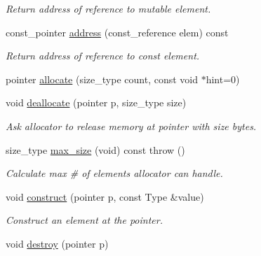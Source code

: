 \begin{DoxyCompactItemize}
\begin{DoxyCompactList}\small\item\em Return address of reference to mutable element. \end{DoxyCompactList}\item 
\hypertarget{classLoki_1_1LokiAllocator_a6f984e7db2d509ad2b49d2229974d87c}{}const\+\_\+pointer \hyperlink{classLoki_1_1LokiAllocator_a6f984e7db2d509ad2b49d2229974d87c}{address} (const\+\_\+reference elem) const \label{classLoki_1_1LokiAllocator_a6f984e7db2d509ad2b49d2229974d87c}

\begin{DoxyCompactList}\small\item\em Return address of reference to const element. \end{DoxyCompactList}\item 
pointer \hyperlink{classLoki_1_1LokiAllocator_a856c0d1e1f32b786421c02d468020758}{allocate} (size\+\_\+type count, const void $\ast$hint=0)
\item 
\hypertarget{classLoki_1_1LokiAllocator_a3713aa29d4ccf61db725f7ba4111eaa9}{}void \hyperlink{classLoki_1_1LokiAllocator_a3713aa29d4ccf61db725f7ba4111eaa9}{deallocate} (pointer p, size\+\_\+type size)\label{classLoki_1_1LokiAllocator_a3713aa29d4ccf61db725f7ba4111eaa9}

\begin{DoxyCompactList}\small\item\em Ask allocator to release memory at pointer with size bytes. \end{DoxyCompactList}\item 
\hypertarget{classLoki_1_1LokiAllocator_a78270e4c9b333f80199bc0867b4b9e0a}{}size\+\_\+type \hyperlink{classLoki_1_1LokiAllocator_a78270e4c9b333f80199bc0867b4b9e0a}{max\+\_\+size} (void) const   throw ()\label{classLoki_1_1LokiAllocator_a78270e4c9b333f80199bc0867b4b9e0a}

\begin{DoxyCompactList}\small\item\em Calculate max \# of elements allocator can handle. \end{DoxyCompactList}\item 
\hypertarget{classLoki_1_1LokiAllocator_af6f7b3cb7e64ee71a2bda37e78c08654}{}void \hyperlink{classLoki_1_1LokiAllocator_af6f7b3cb7e64ee71a2bda37e78c08654}{construct} (pointer p, const Type \&value)\label{classLoki_1_1LokiAllocator_af6f7b3cb7e64ee71a2bda37e78c08654}

\begin{DoxyCompactList}\small\item\em Construct an element at the pointer. \end{DoxyCompactList}\item 
\hypertarget{classLoki_1_1LokiAllocator_a213cb5506ab35d29ad8a626165d2b03a}{}void \hyperlink{classLoki_1_1LokiAllocator_a213cb5506ab35d29ad8a626165d2b03a}{destroy} (pointer p)\label{classLoki_1_1LokiAllocator_a213cb5506ab35d29ad8a626165d2b03a}


\end{DoxyCompactItemize}
